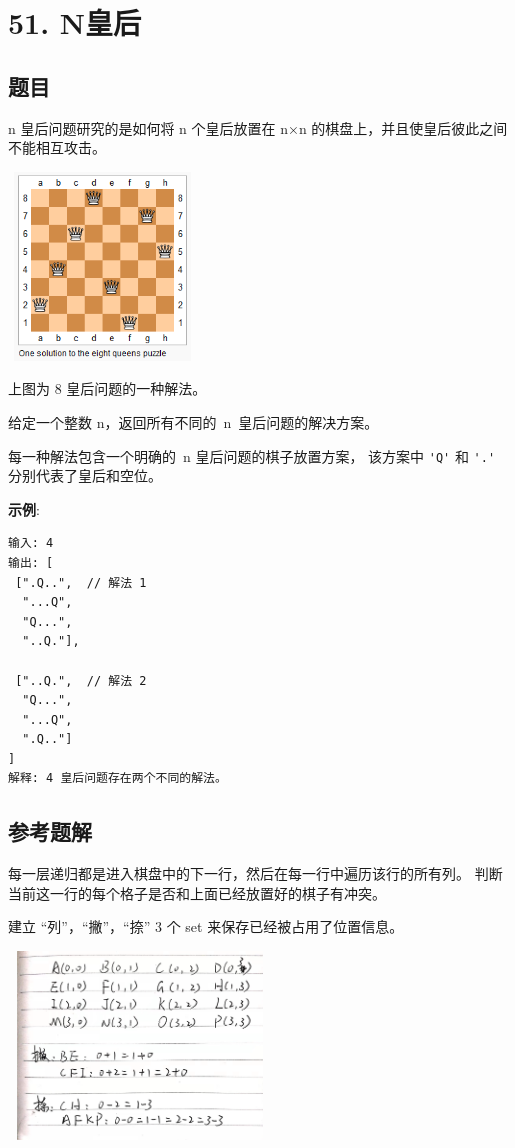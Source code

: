 \newpage
\section{51. N皇后}
\label{leetcode:51}

\subsection{题目}

n 皇后问题研究的是如何将 n 个皇后放置在 n×n 的棋盘上，并且使皇后彼此之间不能相互攻击。

\includegraphics[width=50mm,height=50mm]{images/leetcode/8-queens.png}

上图为 8 皇后问题的一种解法。

给定一个整数 n，返回所有不同的 n 皇后问题的解决方案。

每一种解法包含一个明确的 n 皇后问题的棋子放置方案，
该方案中 \verb|'Q'| 和 \verb|'.'| 分别代表了皇后和空位。

\textbf{示例}:

\begin{verbatim}
输入: 4
输出: [
 [".Q..",  // 解法 1
  "...Q",
  "Q...",
  "..Q."],

 ["..Q.",  // 解法 2
  "Q...",
  "...Q",
  ".Q.."]
]
解释: 4 皇后问题存在两个不同的解法。
\end{verbatim}

\subsection{参考题解}

每一层递归都是进入棋盘中的下一行，然后在每一行中遍历该行的所有列。
判断当前这一行的每个格子是否和上面已经放置好的棋子有冲突。

建立 ``列''，``撇''，``捺'' 3 个 set 来保存已经被占用了位置信息。

\includegraphics[width=70mm,height=50mm]{images/leetcode/51.jpg}

